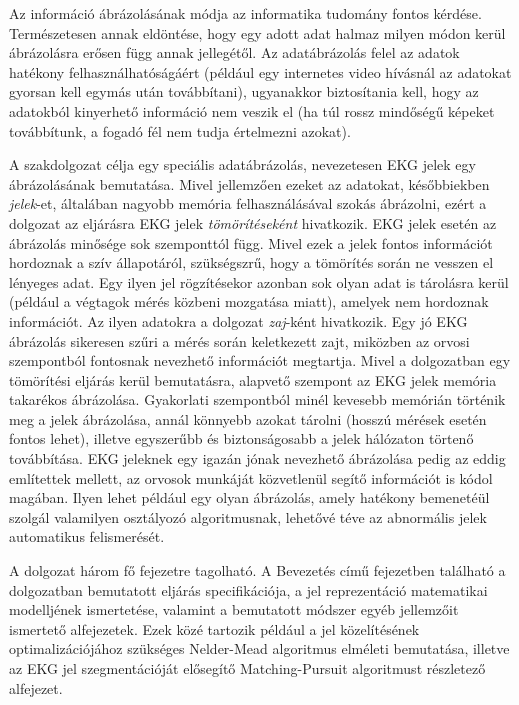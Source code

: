 \documentclass[oneside,titlepage,12pt,a4paper]{report}
\begin{document}
\par
Az információ ábrázolásának módja az informatika tudomány fontos kérdése. Természetesen annak eldöntése, hogy egy adott adat halmaz milyen módon kerül ábrázolásra erősen függ annak jellegétől. Az adatábrázolás felel az adatok hatékony felhasználhatóságáért (például egy internetes video hívásnál az adatokat gyorsan kell egymás után továbbítani), ugyanakkor biztosítania kell, hogy az adatokból kinyerhető információ nem veszik el (ha túl rossz mindőségű képeket továbbítunk, a fogadó fél nem tudja értelmezni azokat). 
\par	A szakdolgozat célja egy speciális adatábrázolás, nevezetesen EKG jelek egy ábrázolásának bemutatása. Mivel jellemzően ezeket az adatokat, későbbiekben \textit{jelek}-et, általában nagyobb memória felhasználásával szokás ábrázolni, ezért a dolgozat az eljárásra EKG jelek \textit{tömörítéseként} hivatkozik. EKG jelek esetén az ábrázolás minősége sok szemponttól függ. Mivel ezek a jelek fontos információt hordoznak a szív állapotáról, szükségszrű, hogy a tömörítés során ne vesszen el lényeges adat. Egy ilyen jel rögzítésekor azonban sok olyan adat is tárolásra kerül (például a végtagok mérés közbeni mozgatása miatt), amelyek nem hordoznak információt. Az ilyen adatokra a dolgozat \textit{zaj}-ként hivatkozik. Egy jó EKG ábrázolás sikeresen szűri a mérés során keletkezett zajt, miközben az orvosi szempontból fontosnak nevezhető információt megtartja. Mivel a dolgozatban egy tömörítési eljárás kerül bemutatásra, alapvető szempont az EKG jelek memória takarékos ábrázolása. Gyakorlati szempontból minél kevesebb memórián történik meg a jelek ábrázolása, annál könnyebb azokat tárolni (hosszú mérések esetén fontos lehet), illetve egyszerűbb és biztonságosabb a jelek hálózaton törtenő továbbítása. EKG jeleknek egy igazán jónak nevezhető ábrázolása pedig az eddig említettek mellett, az orvosok munkáját közvetlenül segítő információt is kódol magában. Ilyen lehet például egy olyan ábrázolás, amely hatékony bemenetéül szolgál valamilyen osztályozó algoritmusnak, lehetővé téve az abnormális jelek automatikus felismerését. 
	\par A dolgozat három fő fejezetre tagolható. A Bevezetés című fejezetben található a dolgozatban bemutatott eljárás specifikációja, a jel reprezentáció matematikai modelljének ismertetése, valamint a bemutatott módszer egyéb jellemzőit ismertető alfejezetek. Ezek közé tartozik például a jel közelítésének optimalizációjához szükséges Nelder-Mead algoritmus elméleti bemutatása, illetve az EKG jel szegmentációját elősegítő Matching-Pursuit algoritmust részletező alfejezet. 
\end{document}
